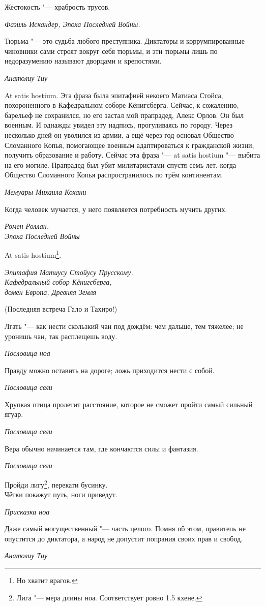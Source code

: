 \documentclass[a4paper,10pt]{book}
\begin{document}
\epigraph{Жестокость "--- храбрость трусов.}
{\textit{Фазиль Искандер, Эпоха Последней Войны.}}

\epigraph{Тюрьма "--- это судьба любого преступника. 
Диктаторы и коррумпированные чиновники сами строят вокруг себя тюрьмы, 
и эти тюрьмы лишь по недоразумению называют дворцами и крепостями.}
{\textit{Анатолиу Тиу}}

\epigraph{At satis hostium. Эта фраза была эпитафией некоего Матиаса Стойса, 
похороненного в Кафедральном соборе Кёнигсберга.
Сейчас, к сожалению, барельеф не сохранился, но его застал мой прапрадед, Алекс 
Орлов. Он был военным. И однажды
увидел эту надпись, прогуливаясь по городу. Через несколько дней он уволился из 
армии, а ещё через год основал Общество
Сломанного Копья, помогающее военным адаптироваться к гражданской жизни, 
получить образование и работу. Сейчас эта фраза "--- at satis hostium "--- 
выбита на его могиле.
Прапрадед был убит милитаристами спустя семь лет, когда Общество Сломанного 
Копья распространилось по трём континентам.}
{\textit{Мемуары Михаила Кохани}}

\epigraph{Когда человек мучается, у него появляется потребность мучить других.}
{\textit{Ромен Роллан.\\Эпоха Последней Войны}}

\epigraph{At satis hostium\footnote{Но хватит врагов.}.}
{\textit{Эпитафия Матиусу Стойусу Прусскому.\\Кафедральный собор 
Кёнигсберга,\\домен Европа, Древняя Земля}}

(Последняя встреча Гало и Тахиро!)

\epigraph{Лгать "--- как нести скользкий чан под дождём: чем дальше, тем 
тяжелее; не уронишь чан, так расплещешь воду.}
{\textit{Пословица ноа}}

\epigraph{Правду можно оставить на дороге; ложь приходится нести с собой.}
{\textit{Пословица сели}}

\epigraph{Хрупкая птица пролетит расстояние, которое не сможет пройти самый 
сильный ягуар.}
{\textit{Пословица сели}}

\epigraph{Вера обычно начинается там, где кончаются силы и фантазия.}
{\textit{Пословица сели}}
\epigraph{Пройди лигу\footnote{Лига "--- мера длины ноа. Соответствует ровно 
1.5 
кхене.}, перекати бусинку.\\
Чётки покажут путь, ноги приведут.}
{\textit{Присказка ноа}}

\epigraph{Даже самый могущественный "--- часть целого. Помня об этом, правитель 
не опустится до диктатора, а народ не допустит попрания своих прав и свобод.}
{\textit{Анатолиу Тиу}}
\end{document}
